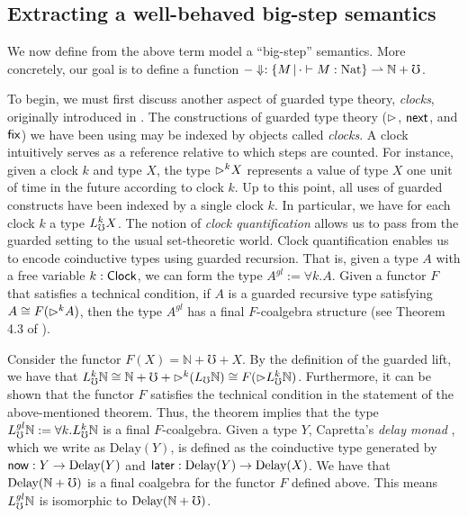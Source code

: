 \subsection{Extracting a well-behaved big-step semantics}\label{sec:big-step-term-semantics}


We now define from the above term model a ``big-step'' semantics. More
concretely, our goal is to define a function 
$-\Downarrow : \{M \,|\, \cdot \vdash M : \text{Nat} \} \rightharpoonup \mathbb{N} + {\mho}$.

To begin, we must first discuss another aspect of guarded type theory,
\emph{clocks}, originally introduced in \cite{atkey-mcbride2013}. The
constructions of guarded type theory (${\vartriangleright}$, $\mathsf{next}$, and $\mathsf{fix}$) we have been
using may be indexed by objects called \emph{clocks}. A clock intuitively serves
as a reference relative to which steps are counted. For instance, given a clock
$k$ and type $X$, the type ${\vartriangleright}^k X$ represents a value of type $X$ one unit
of time in the future according to clock $k$.
%
Up to this point, all uses of guarded constructs have been indexed by a single
clock $k$. In particular, we have for each clock $k$ a type $L_\mho^k X$. The
notion of \emph{clock quantification} allows us to pass from the guarded setting
to the usual set-theoretic world. Clock quantification enables us to encode
coinductive types using guarded recursion. That is, given a type $A$ with a free
variable $k : \mathsf{Clock}$, we can form the type $A^{gl} := \forall k. A$. Given a
functor $F$ that satisfies a technical condition, if $A$ is a guarded recursive
type satisfying $A \cong F({\vartriangleright}^k A)$, then the type $A^{gl}$ has a final
$F$-coalgebra structure (see Theorem 4.3 of
\cite{kristensen-mogelberg-vezzosi2022}). 

Consider the functor $F(X) = \mathbb{N} + {\mho} + X$. By the definition of the
guarded lift, we have that
% 
$L_\mho^k \mathbb{N} 
  \cong \mathbb{N} + {\mho} + {\vartriangleright}^k (L_\mho \mathbb{N}) 
  \cong F({\vartriangleright} L_\mho^k \mathbb{N})$.
%
Furthermore, it can be shown that the functor $F$ satisfies the technical
condition in the statement of the above-mentioned theorem. Thus, the theorem
implies that the type $L_\mho^{gl} \mathbb{N} := \forall k. L_\mho^k \mathbb{N}$ is a
final $F$-coalgebra.
%
Given a type $Y$, Capretta's \emph{delay monad} \cite{lmcs:2265},
which we write as $\text{Delay}(Y)$, is defined as the coinductive type
generated by $\mathsf{now} : Y \to \text{Delay}(Y)$ and $\mathsf{later} : \text{Delay}(Y) \to \text{Delay}(X)$.
We have that $\text{Delay} (\mathbb{N} + {\mho})$ is a final coalgebra for the functor
$F$ defined above. This means $L_\mho^{gl} \mathbb{N}$ is isomorphic to
$\text{Delay}(\mathbb{N} + {\mho})$.

